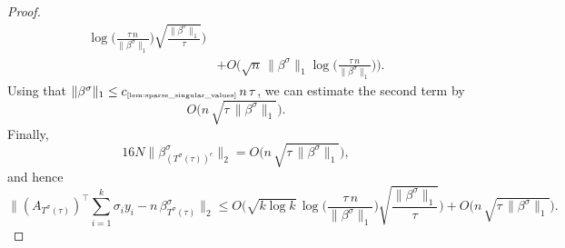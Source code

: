 \documentclass[11pt]{amsart}
\theoremstyle{definition}
\theoremstyle{plain}
\begin{document}
\begin{proof}
\begin{align*}
  \log\Big(\frac{\tau\,n}{\|\beta^\sigma\|_1}\Big)
  \sqrt{\frac{\|\beta^\sigma\|_1}{\tau}}
\bigg)\\
&+
O\bigg(
\sqrt{n}\,\|\beta^\sigma\|_1
  \log\Big(\frac{\tau\,n}{\|\beta^\sigma\|_1}\Big)
\bigg).
\end{align*}
Using that $\|\beta^\sigma\|_1\leq
c_{\text{\tiny\ref{lem:sparse_singular_values}}}\,n\,\tau$,
we can estimate the second term by
$$
O\big(
n\,\sqrt{\tau\,\|\beta^\sigma\|_1}\big).
$$
Finally,
$$
16 N \|\beta^\sigma_{(T^\sigma(\tau))^c}\|_2
=O\big(
n\,\sqrt{\tau\,\|\beta^\sigma\|_1}\big),
$$
and hence
$$
\Big\|(A_{T^\sigma(\tau)})^\top
\sum_{i=1}^k \sigma_i y_i 
-n\,\beta^\sigma_{T^\sigma(\tau)}
\Big\|_2
\leq
O\bigg(
\sqrt{k\log k}\,
  \log\Big(\frac{\tau\,n}{\|\beta^\sigma\|_1}\Big)
  \sqrt{\frac{\|\beta^\sigma\|_1}{\tau}}
\bigg)
+O\big(
n\,\sqrt{\tau\,\|\beta^\sigma\|_1}\big).
$$
\end{proof}
\end{document}
